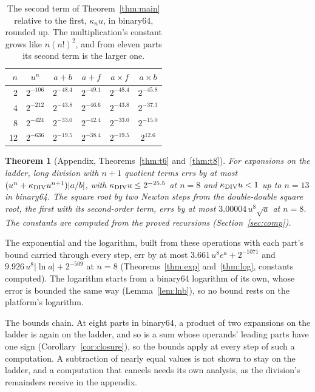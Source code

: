 \documentclass[conference]{IEEEtran}
\newtheorem{theorem}{Theorem}
\theoremstyle{definition}
\theoremstyle{remark}
\newcommand{\kdiv}{\kappa_{\rm DIV}}
\begin{document}
\nopagebreak
\begin{table}[H]
\centering
\caption{The second term of Theorem~\ref{thm:main} relative to the first, $\kappa_nu$, in binary64, rounded up. The
multiplication's constant grows like $n(n!)^2$, and from eleven parts its second term is the larger one.}
\label{tab:main}
\begin{tabular}{rccccc}
\toprule
$n$ & $u^n$ & $a + b$ & $a + f$ & $a \times f$ & $a \times b$ \\
\midrule
2 & $2^{-106}$ & $2^{-48.4}$ & $2^{-49.1}$ & $2^{-48.4}$ & $2^{-45.8}$ \\
4 & $2^{-212}$ & $2^{-43.8}$ & $2^{-46.6}$ & $2^{-43.8}$ & $2^{-37.3}$ \\
8 & $2^{-424}$ & $2^{-33.0}$ & $2^{-42.4}$ & $2^{-33.0}$ & $2^{-15.0}$ \\
12 & $2^{-636}$ & $2^{-19.5}$ & $2^{-38.4}$ & $2^{-19.5}$ & $2^{12.6}$ \\
\bottomrule
\end{tabular}
\end{table}

\begin{theorem}[Appendix, Theorems~\ref{thm:t6} and~\ref{thm:t8}]\label{thm:divsqrt}
For expansions on the ladder, long division with $n+1$ quotient terms errs by at most $(u^n + \kdiv u^{n+1})|a/b|$, with
$\kdiv u \le 2^{-25.5}$ at $n = 8$ and $\kdiv u < 1$ up to $n = 13$ in binary64. The square root by two Newton steps from the
double-double square root, the first with its second-order term, errs by at most $3.00004\,u^8\sqrt a$ at $n = 8$.
The constants are computed from the proved recursions (Section~\ref{sec:comp}).
\end{theorem}

The exponential and the logarithm, built from these operations with each part's bound carried through every step, err
by at most $3.661\,u^8e^a + 2^{-1071}$ and $9.926\,u^8|\ln a| + 2^{-509}$ at $n = 8$ (Theorems~\ref{thm:exp}
and~\ref{thm:log}, constants computed). The logarithm starts from a binary64 logarithm of its own, whose error is
bounded the same way (Lemma~\ref{lem:lnb}), so no bound rests on the platform's logarithm.

The bounds chain. At eight parts in binary64, a product of two expansions on the ladder is again on the ladder, and
so is a sum whose operands' leading parts have one sign (Corollary~\ref{cor:closure}), so the bounds apply at every
step of such a computation. A
subtraction of nearly equal values is not shown to stay on the ladder, and a computation that cancels needs its own
analysis, as the division's remainders receive in the appendix.
\end{document}
